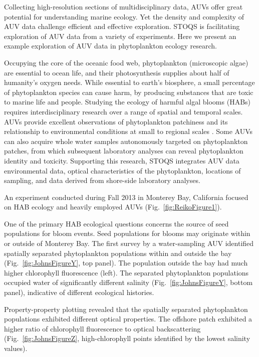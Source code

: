 \documentclass[conference]{IEEEtran}
\begin{document}
Collecting high-resolution sections of multidisciplinary data, AUVs offer great potential for understanding marine ecology.  Yet the density and complexity of AUV data challenge efficient and effective exploration.  STOQS is facilitating exploration of AUV data from a variety of experiments.  Here we present an example exploration of AUV data in phytoplankton ecology research.

Occupying the core of the oceanic food web, phytoplankton (microscopic algae) are essential to ocean life, and their photosynthesis supplies about half of humanity's oxygen needs.  While essential to earth’s biosphere, a small percentage of phytoplankton species can cause harm, by producing substances that are toxic to marine life and people.  Studying the ecology of harmful algal blooms (HABs) requires interdisciplinary research over a range of spatial and temporal scales. AUVs provide excellent observations of phytoplankton patchiness and its relationship to environmental conditions at small to regional scales \cite{Scholin2000}.  Some AUVs can also acquire whole water samples autonomously targeted on phytoplankton patches, from which subsequent laboratory analyses can reveal phytoplankton identity and toxicity.  Supporting this research, STOQS integrates AUV data environmental data, optical characteristics of the phytoplankton, locations of sampling, and data derived from shore-side laboratory analyses.

An experiment conducted during Fall 2013 in Monterey Bay, California focused on HAB ecology and heavily employed AUVs (Fig.~\ref{fig:ReikoFigure1}).  

One of the primary HAB ecological questions concerns the source of seed populations for bloom events.  Seed populations for blooms may originate within or outside of Monterey Bay.  The first survey by a water-sampling AUV identified spatially separated phytoplankton populations within and outside the bay (Fig.~\ref{fig:JohnsFigureY}, top panel).  The population outside the bay had much higher chlorophyll fluorescence (left).  The separated phytoplankton populations occupied water of significantly different salinity (Fig.~\ref{fig:JohnsFigureY}, bottom panel), indicative of different ecological histories.

Property-property plotting revealed that the spatially separated phytoplankton populations exhibited different optical properties.  The offshore patch exhibited a higher ratio of chlorophyll fluorescence to optical backscattering (Fig.~\ref{fig:JohnsFigureZ}, high-chlorophyll points identified by the lowest salinity values).
\end{document}
